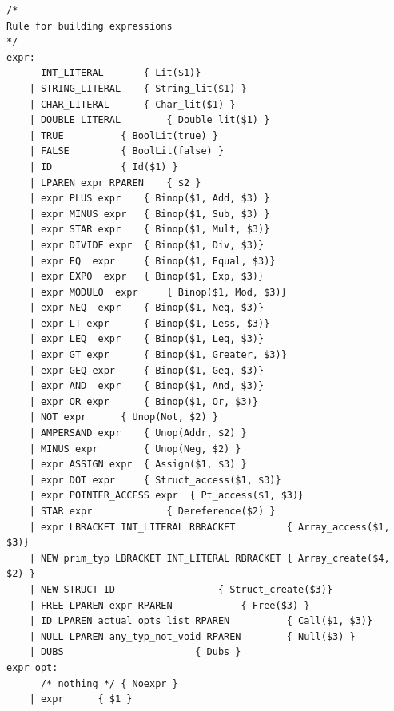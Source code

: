 \documentclass{article}
\begin{document}
\begin{lstlisting}
/* 
Rule for building expressions 
*/
expr:
	  INT_LITERAL 		{ Lit($1)}
	| STRING_LITERAL	{ String_lit($1) }  
	| CHAR_LITERAL 		{ Char_lit($1) }
	| DOUBLE_LITERAL        { Double_lit($1) }
	| TRUE			{ BoolLit(true) }
	| FALSE			{ BoolLit(false) }
	| ID 			{ Id($1) }
	| LPAREN expr RPAREN 	{ $2 }
	| expr PLUS expr 	{ Binop($1, Add, $3) }
	| expr MINUS expr 	{ Binop($1, Sub, $3) }
	| expr STAR expr 	{ Binop($1, Mult, $3)}
	| expr DIVIDE expr 	{ Binop($1, Div, $3)}
	| expr EQ  expr 	{ Binop($1, Equal, $3)}
	| expr EXPO  expr 	{ Binop($1, Exp, $3)}
	| expr MODULO  expr 	{ Binop($1, Mod, $3)}
	| expr NEQ  expr 	{ Binop($1, Neq, $3)}
	| expr LT expr 		{ Binop($1, Less, $3)}
	| expr LEQ  expr 	{ Binop($1, Leq, $3)}
	| expr GT expr 		{ Binop($1, Greater, $3)}
	| expr GEQ expr 	{ Binop($1, Geq, $3)}
	| expr AND  expr 	{ Binop($1, And, $3)}
	| expr OR expr 		{ Binop($1, Or, $3)}
	| NOT expr		{ Unop(Not, $2) }
	| AMPERSAND expr	{ Unop(Addr, $2) }
	| MINUS expr		{ Unop(Neg, $2) }
	| expr ASSIGN expr 	{ Assign($1, $3) }
	| expr DOT expr 	{ Struct_access($1, $3)}
	| expr POINTER_ACCESS expr 	{ Pt_access($1, $3)}
	| STAR expr 			{ Dereference($2) }
	| expr LBRACKET INT_LITERAL RBRACKET 	     { Array_access($1, $3)}
	| NEW prim_typ LBRACKET INT_LITERAL RBRACKET { Array_create($4, $2) }
	| NEW STRUCT ID 			     { Struct_create($3)}
	| FREE LPAREN expr RPAREN		     { Free($3) }
	| ID LPAREN actual_opts_list RPAREN          { Call($1, $3)}
	| NULL LPAREN any_typ_not_void RPAREN 	     { Null($3) }
 	| DUBS					     { Dubs }
expr_opt:
	  /* nothing */ { Noexpr }
	| expr 		{ $1 }

\end{lstlisting}

\newpage
\end{document}
